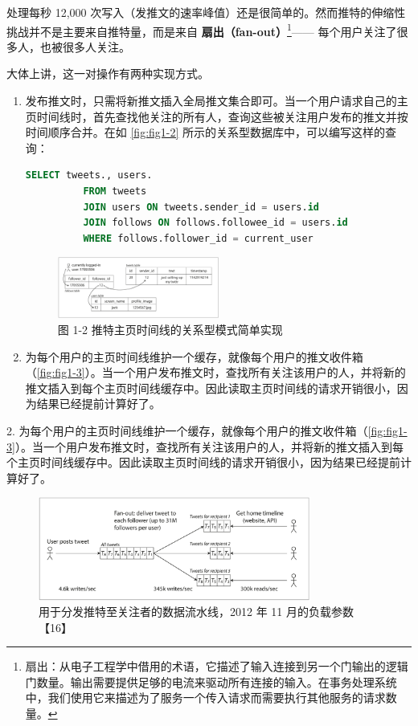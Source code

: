 处理每秒 12,000 次写入（发推文的速率峰值）还是很简单的。然而推特的伸缩性挑战并不是主要来自推特量，而是来自 \textbf{扇出（fan-out）}\footnote{扇出：从电子工程学中借用的术语，它描述了输入连接到另一个门输出的逻辑门数量。输出需要提供足够的电流来驱动所有连接的输入。在事务处理系统中，我们使用它来描述为了服务一个传入请求而需要执行其他服务的请求数量。}—— 每个用户关注了很多人，也被很多人关注。

大体上讲，这一对操作有两种实现方式。

\begin{enumerate}
  \item 发布推文时，只需将新推文插入全局推文集合即可。当一个用户请求自己的主页时间线时，首先查找他关注的所有人，查询这些被关注用户发布的推文并按时间顺序合并。在如 \autoref{fig:fig1-2} 所示的关系型数据库中，可以编写这样的查询：
        \begin{lstlisting}[language=sql]
          SELECT tweets., users.
          FROM tweets
          JOIN users ON tweets.sender_id = users.id
          JOIN follows ON follows.followee_id = users.id
          WHERE follows.follower_id = current_user
        \end{lstlisting}
        \begin{figure}
          \centering
          \includegraphics[width=0.5\textwidth]{img/fig1-2.png}
          \caption{图 1-2 推特主页时间线的关系型模式简单实现}
          \label{fig:fig1-2}
        \end{figure}
  \item 为每个用户的主页时间线维护一个缓存，就像每个用户的推文收件箱（\autoref{fig:fig1-3}）。当一个用户发布推文时，查找所有关注该用户的人，并将新的推文插入到每个主页时间线缓存中。因此读取主页时间线的请求开销很小，因为结果已经提前计算好了。
\end{enumerate}

2. 为每个用户的主页时间线维护一个缓存，就像每个用户的推文收件箱（\autoref{fig:fig1-3}）。当一个用户发布推文时，查找所有关注该用户的人，并将新的推文插入到每个主页时间线缓存中。因此读取主页时间线的请求开销很小，因为结果已经提前计算好了。

\begin{figure}[htbp]

  \centering

  \includegraphics[width=0.8\textwidth]{img/fig1-3.png}

  \caption{用于分发推特至关注者的数据流水线，2012 年 11 月的负载参数【16】}

  \label{fig:fig1-3}

\end{figure}

